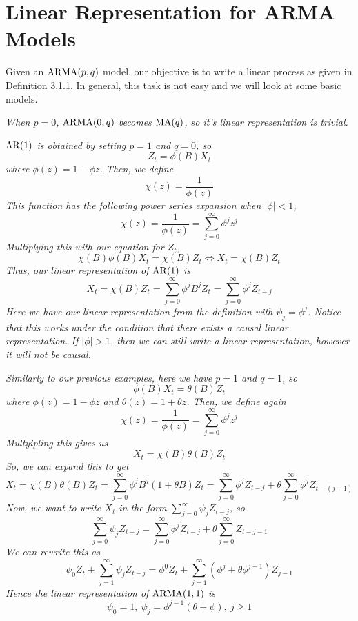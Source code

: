 \section{Linear Representation for ARMA Models}
Given an $\operatorname{ARMA}(p,q)$ model, our objective is to write a linear process as given in 
\hyperref[def:linear_process]{Definition 3.1.1}. In general, this task is not easy and we will look at some basic models.

\begin{example}[MA(q)]
    \emph{
        When $p=0$, $\operatorname{ARMA}(0,q)$ becomes $\operatorname{MA}(q)$, so it's linear representation is trivial.
    }
\end{example}

\begin{example}[AR(1)]\label{ex:ar1}
    \emph{
        $\operatorname{AR}(1)$ is obtained by setting $p=1$ and $q=0$, so 
        \[Z_t = \phi(B)X_t\]
        where $\phi(z) = 1-\phi z$. Then, we define 
        \[\chi(z) = \frac{1}{\phi(z)}\]
        This function has the following power series expansion when $|\phi| < 1$, 
        \[\chi(z) = \frac{1}{\phi(z)} = \sum_{j=0}^\infty \phi^jz^j\]
        Multiplying this with our equation for $Z_t$, 
        \[\chi(B)\phi(B)X_t = \chi(B)Z_t \iff X_t = \chi(B)Z_t\]
        Thus, our linear representation of $\operatorname{AR}(1)$ is 
        \[X_t = \chi(B)Z_t = \sum_{j=0}^\infty \phi^jB^jZ_t = \sum_{j=0}^\infty \phi^jZ_{t-j}\]
        Here we have our linear representation from the definition with $\psi_j = \phi^j$. Notice that this works under the condition that there exists a causal linear representation. If $|\phi| > 1$, then we can still write a linear representation, however it will not be causal.
    }
\end{example}

\begin{example}[ARMA(1,1)]\label{ex:linear_arma11}
    \emph{
        Similarly to our previous examples, here we have $p=1$ and $q=1$, so
        \[\phi(B)X_t = \theta(B)Z_t\]
        where $\phi(z) = 1 - \phi z$ and $\theta(z) = 1 + \theta z$. Then, we define again 
        \[\chi(z) = \frac{1}{\phi(z)} = \sum_{j=0}^\infty \phi^jz^j\]
        Multyipling this gives us 
        \[X_t = \chi(B)\theta(B)Z_t\]
        So, we can expand this to get 
        \[X_t = \chi(B)\theta(B)Z_t = \sum_{j=0}^\infty \phi^jB^j(1+\theta B)Z_t = \sum_{j=0}^\infty \phi^jZ_{t-j} + \theta\sum_{j=0}^\infty \phi^jZ_{t-(j+1)}\]
        Now, we want to write $X_t$ in the form $\sum\limits_{j=0}^\infty \psi_jZ_{t-j}$, so
        \[\sum_{j=0}^\infty \psi_jZ_{t-j} = \sum_{j=0}^\infty \phi^jZ_{t-j} + \theta\sum_{j=0}^\infty Z_{t-j-1}\]
        We can rewrite this as 
        \[\psi_0Z_t + \sum_{j=1}^\infty \psi_jZ_{t-j} = \phi^0Z_t + \sum_{j=1}^\infty (\phi^j + \theta \phi^{j-1})Z_{j-1}\]
        Hence the linear representation of $\operatorname{ARMA}(1,1)$ is 
        \[\psi_0 = 1, \ \psi_j = \phi^{j-1}(\theta + \psi), \ j \geq 1\]
    }    
\end{example}

